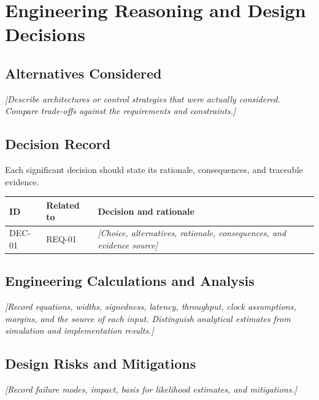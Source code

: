 \chapter{Engineering Reasoning and Design Decisions}

\section{Alternatives Considered}
\textit{[Describe architectures or control strategies that were actually considered. Compare trade-offs against the requirements and constraints.]}

\section{Decision Record}
Each significant decision should state its rationale, consequences, and traceable evidence.

\begin{tabularx}{\textwidth}{@{}p{17mm}p{23mm}X@{}}
  \toprule
  ID & Related to & Decision and rationale \\
  \midrule
  DEC-01 & REQ-01 & \textit{[Choice, alternatives, rationale, consequences, and evidence source]} \\
  \bottomrule
\end{tabularx}

\section{Engineering Calculations and Analysis}
\textit{[Record equations, widths, signedness, latency, throughput, clock assumptions, margins, and the source of each input. Distinguish analytical estimates from simulation and implementation results.]}


\section{Design Risks and Mitigations}
\textit{[Record failure modes, impact, basis for likelihood estimates, and mitigations.]}
